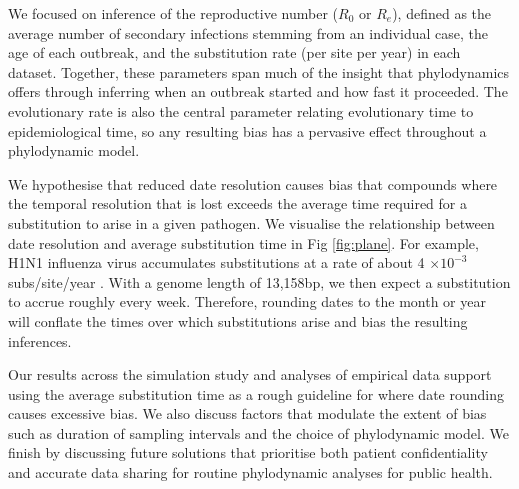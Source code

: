 \documentclass[11pt]{article}
\begin{document}
\begin{spacing}{1.5}
We focused on inference of the reproductive number ($R_0$ or $R_e$), defined as the average number of secondary infections stemming from an individual case, the age of each outbreak, and the substitution rate (per site per year) in each dataset. Together, these parameters span much of the insight that phylodynamics offers through inferring when an outbreak started and how fast it proceeded. The evolutionary rate is also the central parameter relating evolutionary time to epidemiological time, so any resulting bias has a pervasive effect throughout a phylodynamic model.

 We hypothesise that reduced date resolution causes bias that compounds where the temporal resolution that is lost exceeds the average time required for a substitution to arise in a given pathogen. We visualise the relationship between date resolution and average substitution time in Fig \ref{fig:plane}. For example, H1N1 influenza virus accumulates substitutions at a rate of about 4 $\times10^{-3}$ subs/site/year \citep{hedge_2013_real-time}. With a genome length of 13,158bp, we then expect a substitution to accrue roughly every week. Therefore, rounding dates to the month or year will conflate the times over which substitutions arise and bias the resulting inferences. 
 
 Our results across the simulation study and analyses of empirical data support using the average substitution time as a rough guideline for where date rounding causes excessive bias. We also discuss factors that modulate the extent of bias such as duration of sampling intervals and the choice of phylodynamic model. We finish by discussing future solutions that prioritise both patient confidentiality and accurate data sharing for routine phylodynamic analyses for public health.


\end{spacing}
\end{document}
